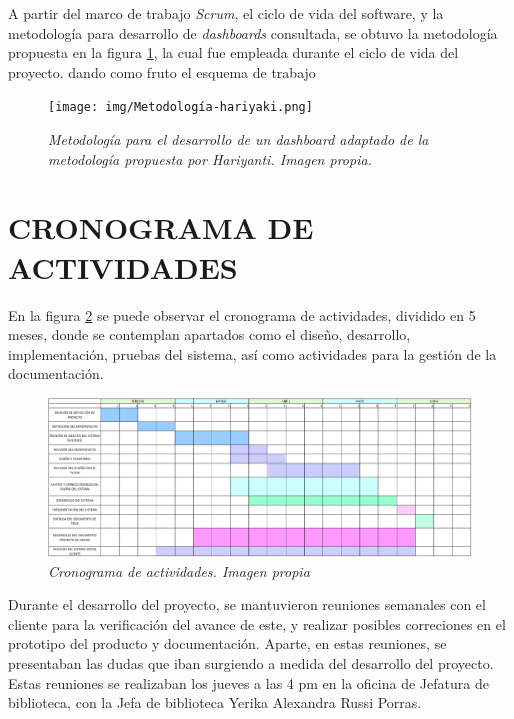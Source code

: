 \documentclass[spanish]{ieee_upb}
\begin{document}
\vspace{0.3cm}
A partir del marco de trabajo \textit{Scrum}, el ciclo de vida del software, y la metodología para desarrollo
 de \textit{dashboards} consultada, se obtuvo la metodología propuesta en la figura \ref{fig:hariyanti}, 
 la cual fue empleada durante el ciclo de vida del proyecto.   
dando como fruto el esquema de trabajo 
\vspace{0.3cm}
\begin{figure}[htpb] 
	\centering
	\texttt{[image: img/Metodología-hariyaki.png]}
	\vspace{-1mm}
	\caption[Metodología propuesta a emplear durante el proyecto]{\textit{Metodología para el desarrollo de un dashboard adaptado de la metodología propuesta por Hariyanti\cite{hariyanti-dashboard}. Imagen propia.}}
	\label{fig:hariyanti} 
\end{figure}







\newpage
\section{\label{sec:cronograma}CRONOGRAMA DE ACTIVIDADES}
En la figura \ref{fig:cronograma} se puede observar el cronograma de actividades, dividido en 5 meses, donde se contemplan apartados como el diseño, desarrollo, implementación, pruebas del sistema, así como actividades para la gestión de la documentación. 

\vspace{0.3cm}
\begin{figure}[htpb] 
	\centering
	\includegraphics[width=0.8\linewidth]{img/Cronograma-ajustado-2.png}
	\vspace{-1mm}
	\caption[Cronograma de actividades]{\textit{Cronograma de actividades. Imagen propia}}
	\label{fig:cronograma} 
\end{figure}

\vspace{0.3cm}
Durante el desarrollo del proyecto, se mantuvieron reuniones semanales con el cliente para la verificación del avance de este, y realizar posibles correciones en el prototipo del producto y documentación. Aparte, en estas reuniones, se presentaban las dudas que iban surgiendo a medida del desarrollo del proyecto. Estas reuniones se realizaban los jueves a las 4 pm en la oficina de Jefatura de biblioteca, con la Jefa de biblioteca Yerika Alexandra Russi Porras. 
\end{document}
